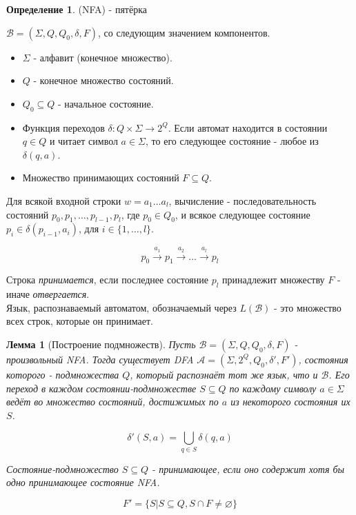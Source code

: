\documentclass[a4paper]{article}
\theoremstyle{indented}
\newtheorem{lemma}{Лемма}
\theoremstyle{definition}
\newtheorem{defn}{Определение}
\theoremstyle{remark}
\DeclareMathOperator{\ra}{\rightarrow}
\begin{document}
\begin{defn}
     (NFA) - пятёрка \ 

    $\mathcal{B} = (\Sigma, Q, Q_0, \delta, F )$, со следующим значением компонентов.

    \begin{itemize}
        \item $\Sigma$ - алфавит (конечное множество).
        \item $Q$ - конечное множество состояний.
        \item $Q_0 \subseteq Q$ - начальное состояние.
        \item Функция переходов $\delta : Q \times \Sigma \ra 2^Q$. Если автомат находится в состоянии $q \in Q$ и читает символ $a \in \Sigma$, то его следующее состояние - любое из $\delta(q,a)$. 
        \item Множество принимающих состояний $F \subseteq Q$.
    \end{itemize}

    Для всякой входной строки $w = a_1 \ldots a_l$, вычисление - последовательность состояний $p_0, p_1, \ldots , p_{l-1}, p_l$, где $p_0 \in Q_0$, и всякое следующее состояние $p_i \in \delta(p_{i-1}, a_i)$, для $i \in \{1, \ldots, l\}$.

    \[
        p_0 \xrightarrow{a_1} p_1 \xrightarrow{a_2} \ldots \xrightarrow{a_l} p_l
    \]

    Строка \textit{принимается}, если последнее состояние $p_l$ принадлежит множеству $F$ - иначе \textit{отвергается}. \\ 

    Язык, распознаваемый автоматом, обозначаемый через $L(\mathcal{B})$ - это множество всех строк, которые он принимает.
\end{defn}

\begin{lemma}[Построение подмножеств]
    Пусть $\mathcal{B} = (\Sigma,Q,Q_0,\delta,F)$ - произвольный NFA. Тогда существует DFA $\mathcal{A} = (\Sigma, 2^Q, Q_0, \delta', F ')$, состояния которого - подмножества $Q$, который распознаёт тот же язык, что и $\mathcal{B}$. Его переход в каждом состоянии-подмножестве $S \subseteq Q$ по каждому символу $a \in \Sigma$ ведёт во множество состояний, достижимых по $a$ из некоторого состояния их $S$.

    \[ 
        \delta'(S,a) = \bigcup_{q\in S} \delta(q,a) 
    \]

    Состояние-подмножество $S \subseteq Q$ - принимающее, если оно содержит хотя бы одно принимающее состояние NFA.
    
    \[
        F ' = \{ S | S \subseteq Q, S \cap F \neq \varnothing \}
    \]
\end{lemma}
\end{document}
